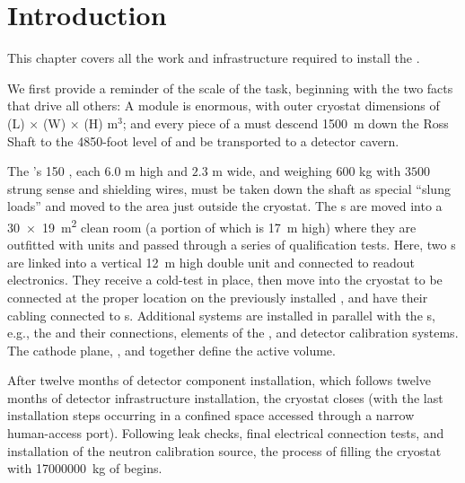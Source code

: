 
\section{Introduction}
\label{ch:sp-install-intro}

This chapter covers all the work and infrastructure required to install the . 
 
We first provide a reminder of the scale of the task, beginning with the two facts that drive all others: A   module is enormous, with outer cryostat dimensions  of 
\cryostatlen{}(L) $\times$ \cryostatwdth{}(W) $\times$ \cryostatht{}(H) m$^{3}$; 
and every piece of a  must descend 
\SI{1500}{m} down the Ross Shaft to the 4850-foot level of  and be transported to a detector cavern.


The 's 150 , each $6.0$ m high and $2.3$ m wide, and  weighing $600$ kg with $3500$ strung sense and shielding wires, must be taken down the shaft as special ``slung loads'' and moved to the area just outside the  cryostat. 
The s are moved into a \SI{30x19}{\square\meter} clean room (a portion of which is \SI{17}{m} high) where they are outfitted  with  units and passed through a series of qualification tests.
Here, two s are linked into a vertical \SI{12}{m} high double unit and connected to readout electronics. 
They receive a cold-test in place, then move into the cryostat to be connected at the proper location on the previously installed , and have their cabling connected to \fdth{}s. 
Additional systems are installed in parallel with the s, e.g., the  and their  connections, elements of the , and detector calibration systems. The cathode plane, , and  together define the  active volume. 

After twelve months of detector component installation, which follows twelve months of detector infrastructure installation, the cryostat closes (with the last installation steps occurring in a confined space accessed through a narrow human-access port). 
Following leak checks, final electrical connection tests, and installation of the neutron calibration source, the process of filling the cryostat with \SI{17000000}{\kilo\gram} of  begins.

